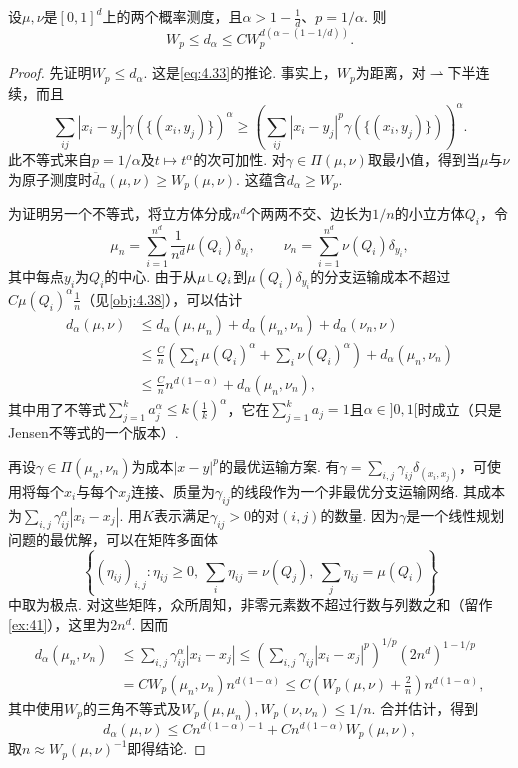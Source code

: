 \begin{proposition}\label{obj:5.36}
设$\mu,\nu$是$[0,1]^d$上的两个概率测度，且$\alpha>1-\frac1d$、$p=1/\alpha$. 则
\[
W_p\le d_\alpha\le CW_p^{d(\alpha-(1-1/d))}.
\]
\end{proposition}
\begin{proof}
先证明$W_p\le d_\alpha$. 这是\eqref{eq:4.33}的推论. 事实上，$W_p$为距离，对$\rightharpoonup$下半连续，而且
\[
\sum_{ij}|x_i-y_j|\gamma(\{(x_i,y_j)\})^\alpha
\ge\left(\sum_{ij}|x_i-y_j|^p\gamma(\{(x_i,y_j)\})\right)^\alpha.
\]
此不等式来自$p=1/\alpha$及$t\mapsto t^\alpha$的次可加性. 对$\gamma\in\Pi(\mu,\nu)$取最小值，得到当$\mu$与$\nu$为原子测度时$\overline d_\alpha(\mu,\nu)\ge W_p(\mu,\nu)$. 这蕴含$d_\alpha\ge W_p$.

为证明另一个不等式，将立方体分成$n^d$个两两不交、边长为$1/n$的小立方体$Q_i$，令
\[
\mu_n=\sum_{i=1}^{n^d}\frac1{n^d}\mu(Q_i)\delta_{y_i},
\qquad\nu_n=\sum_{i=1}^{n^d}\nu(Q_i)\delta_{y_i},
\]
其中每点$y_i$为$Q_i$的中心. 由于从$\mu\restr Q_i$到$\mu(Q_i)\delta_{y_i}$的分支运输成本不超过$C\mu(Q_i)^\alpha\frac1n$（见\autoref{obj:4.38}），可以估计
\[
\begin{aligned}
d_\alpha(\mu,\nu)&\le d_\alpha(\mu,\mu_n)+d_\alpha(\mu_n,\nu_n)+d_\alpha(\nu_n,\nu)\\
&\le\frac Cn\left(\sum_i\mu(Q_i)^\alpha+\sum_i\nu(Q_i)^\alpha\right)+d_\alpha(\mu_n,\nu_n)\\
&\le\frac Cn n^{d(1-\alpha)}+d_\alpha(\mu_n,\nu_n),
\end{aligned}
\]
其中用了不等式$\sum_{j=1}^k a_j^\alpha\le k(\frac1k)^\alpha$，它在$\sum_{j=1}^k a_j=1$且$\alpha\in]0,1[$时成立（只是Jensen不等式的一个版本）.

再设$\gamma\in\Pi(\mu_n,\nu_n)$为成本$|x-y|^p$的最优运输方案. 有$\gamma=\sum_{i,j}\gamma_{ij}\delta_{(x_i,x_j)}$，可使用将每个$x_i$与每个$x_j$连接、质量为$\gamma_{ij}$的线段作为一个非最优分支运输网络. 其成本为$\sum_{i,j}\gamma_{ij}^\alpha|x_i-x_j|$. 用$K$表示满足$\gamma_{ij}>0$的对$(i,j)$的数量. 因为$\gamma$是一个线性规划问题的最优解，可以在矩阵多面体
\[
\left\{(\eta_{ij})_{i,j}:\eta_{ij}\ge0,\ \sum_i\eta_{ij}=\nu(Q_j),\ \sum_j\eta_{ij}=\mu(Q_i)\right\}
\]
中取为极点. 对这些矩阵，众所周知，非零元素数不超过行数与列数之和（留作\autoref{ex:41}），这里为$2n^d$. 因而
\[
\begin{aligned}
d_\alpha(\mu_n,\nu_n)
&\le\sum_{i,j}\gamma_{ij}^\alpha|x_i-x_j|
\le\left(\sum_{i,j}\gamma_{ij}|x_i-x_j|^p\right)^{1/p}(2n^d)^{1-1/p}\\
&=CW_p(\mu_n,\nu_n)n^{d(1-\alpha)}
\le C\left(W_p(\mu,\nu)+\frac2n\right)n^{d(1-\alpha)},
\end{aligned}
\]
其中使用$W_p$的三角不等式及$W_p(\mu,\mu_n),W_p(\nu,\nu_n)\le1/n$. 合并估计，得到
\[
d_\alpha(\mu,\nu)\le Cn^{d(1-\alpha)-1}+Cn^{d(1-\alpha)}W_p(\mu,\nu),
\]
取$n\approx W_p(\mu,\nu)^{-1}$即得结论.
\end{proof}

